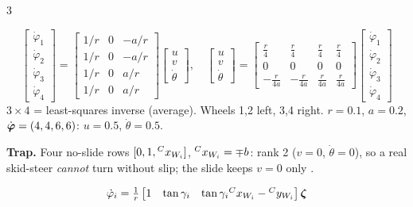 \begin{multicols}{3}
\begin{fbx}[Skid-steer \pg{50, 52}: $W_1(-b,a)$, $W_2(b,a)$, $W_3(-b,-a)$, $W_4(b,-a)$, $\beta=\gamma=0$]
\[\begin{bmatrix}\dot\varphi_1\\\dot\varphi_2\\\dot\varphi_3\\\dot\varphi_4\end{bmatrix}=\begin{bmatrix}1/r&0&-a/r\\1/r&0&-a/r\\1/r&0&a/r\\1/r&0&a/r\end{bmatrix}\begin{bmatrix}u\\v\\\dot\theta\end{bmatrix},\quad
\begin{bmatrix}u\\v\\\dot\theta\end{bmatrix}=\begin{bmatrix}\frac r4&\frac r4&\frac r4&\frac r4\\0&0&0&0\\-\frac r{4a}&-\frac r{4a}&\frac r{4a}&\frac r{4a}\end{bmatrix}\begin{bmatrix}\dot\varphi_1\\\dot\varphi_2\\\dot\varphi_3\\\dot\varphi_4\end{bmatrix}\]
$3\times4$ = least-squares inverse (average). Wheels 1,2 left, 3,4 right. $r=0.1$, $a=0.2$, $\dot{\boldsymbol\varphi}=(4,4,6,6)$: $u=0.5$, $\dot\theta=0.5$. \chk
\end{fbx}
\textbf{Trap.} Four no-slide rows $[0,1,{}^{C}x_{W_{i}}]$, ${}^{C}x_{W_{i}}=\mp b$: rank 2 ($v=0$, $\dot\theta=0$), so a real skid-steer \emph{cannot} turn without slip; the slide keeps $v=0$ only \added.
\begin{fbx}[4 Swedish wheels \pg{55}, $\beta_i=0$, wheels at $(\pm\ell,\pm w)$ \added]
\[\dot\varphi_i=\tfrac1r\begin{bmatrix}1&\tan\gamma_i&\tan\gamma_i{}^{C}x_{W_{i}}-{}^{C}y_{W_{i}}\end{bmatrix}\boldsymbol\zeta\]

\end{fbx}
\end{multicols}
